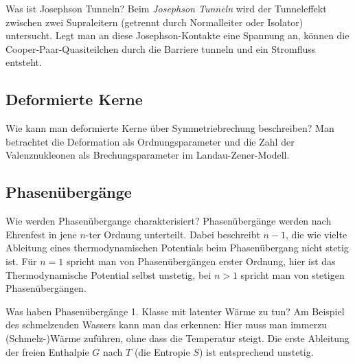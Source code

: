 \begin{fquestion}{Was ist Josephson Tunneln?}
    Beim \textit{Josephson Tunneln} wird der Tunneleffekt zwischen zwei Supraleitern (getrennt durch Normalleiter oder Isolator) untersucht.
    Legt man an diese Josephson-Kontakte eine Spannung an, können die Cooper-Paar-Quasiteilchen durch die Barriere tunneln und ein Stromfluss entsteht.    
\end{fquestion}

\subsection{Deformierte Kerne}


\begin{fquestion}{Wie kann man deformierte Kerne über Symmetriebrechung beschreiben?}
    Man betrachtet die Deformation als Ordnungsparameter und die Zahl der Valenznukleonen als Brechungsparameter im Landau-Zener-Modell.
\end{fquestion}

\subsection{Phasenübergänge}

\begin{fquestion}{Wie werden Phasenübergange charakterisiert?}
    Phasenübergänge werden nach Ehrenfest in jene $n$-ter Ordnung unterteilt.
    Dabei beschreibt $n-1$, die wie vielte Ableitung eines thermodynamischen Potentials beim Phasenübergang nicht stetig ist.
    Für $n=1$ spricht man von Phasenübergängen erster Ordnung, hier ist das Thermodynamische Potential selbst unstetig, bei $n>1$ spricht man von stetigen Phasenübergängen.
\end{fquestion}

\begin{fquestion}{Was haben Phasenübergänge 1. Klasse mit latenter Wärme zu tun?}
    Am Beispiel des schmelzenden Wassers kann man das erkennen: Hier muss man immerzu (Schmelz-)Wärme zuführen, ohne dass die Temperatur steigt. 
    Die erste Ableitung der freien Enthalpie $G$ nach $T$ (die Entropie $S$) ist entsprechend unstetig.
\end{fquestion}

